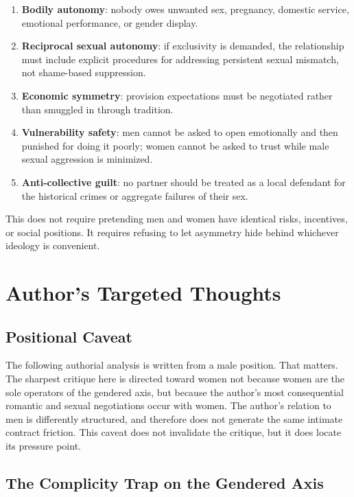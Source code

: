 \documentclass[12pt]{article}
\begin{document}
\begin{enumerate}
  \item \textbf{Bodily autonomy}: nobody owes unwanted sex, pregnancy, domestic service, emotional performance, or gender display.
  \item \textbf{Reciprocal sexual autonomy}: if exclusivity is demanded, the relationship must include explicit procedures for addressing persistent sexual mismatch, not shame-based suppression.
  \item \textbf{Economic symmetry}: provision expectations must be negotiated rather than smuggled in through tradition.
  \item \textbf{Vulnerability safety}: men cannot be asked to open emotionally and then punished for doing it poorly; women cannot be asked to trust while male sexual aggression is minimized.
  \item \textbf{Anti-collective guilt}: no partner should be treated as a local defendant for the historical crimes or aggregate failures of their sex.
\end{enumerate}

This does not require pretending men and women have identical risks, incentives, or social positions. It requires refusing to let asymmetry hide behind whichever ideology is convenient.

\section{Author's Targeted Thoughts}

\subsection{Positional Caveat}

The following authorial analysis is written from a male position. That matters. The sharpest critique here is directed toward women not because women are the sole operators of the gendered axis, but because the author's most consequential romantic and sexual negotiations occur with women. The author's relation to men is differently structured, and therefore does not generate the same intimate contract friction. This caveat does not invalidate the critique, but it does locate its pressure point.

\subsection{The Complicity Trap on the Gendered Axis}
\end{document}
